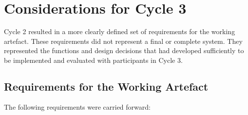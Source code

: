 \section{Considerations for Cycle 3}

Cycle 2 resulted in a more clearly defined set of requirements for the working artefact. These requirements did not represent a final or complete system. They represented the functions and design decisions that had developed sufficiently to be implemented and evaluated with participants in Cycle 3.


\subsection{Requirements for the Working Artefact}

The following requirements were carried forward:

